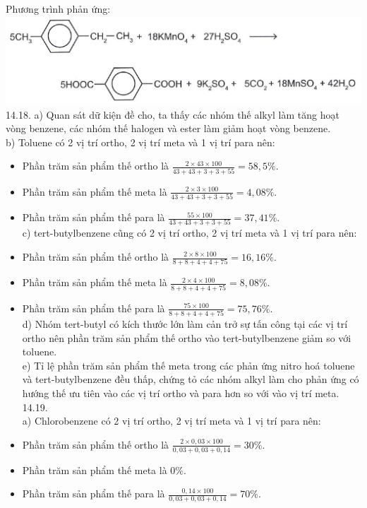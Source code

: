 \documentclass[10pt]{article}
\begin{document}
Phương trình phản ứng:\\
\includegraphics[max width=\textwidth, center]{2025_10_23_adad5b98d65ac6665838g-26(7)}\\
14.18. a) Quan sát dữ kiện đề cho, ta thấy các nhóm thế alkyl làm tăng hoạt vòng benzene, các nhóm thế halogen và ester làm giảm hoạt vòng benzene.\\
b) Toluene có 2 vị trí ortho, 2 vị trí meta và 1 vị trí para nên:

\begin{itemize}
  \item Phần trăm sản phẩm thế ortho là $\frac{2 \times 43 \times 100}{43+43+3+3+55}=58,5 \%$.
  \item Phần trăm sản phẩm thế meta là $\frac{2 \times 3 \times 100}{43+43+3+3+55}=4,08 \%$.
  \item Phần trăm sản phẩm thế para là $\frac{55 \times 100}{43+43+3+3+55}=37,41 \%$.\\
c) tert-butylbenzene cũng có 2 vị trí ortho, 2 vị trí meta và 1 vị trí para nên:
  \item Phần trăm sản phẩm thế ortho là $\frac{2 \times 8 \times 100}{8+8+4+4+75}=16,16 \%$.
  \item Phần trăm sản phẩm thế meta là $\frac{2 \times 4 \times 100}{8+8+4+4+75}=8,08 \%$.
  \item Phần trăm sản phẩm thế para là $\frac{75 \times 100}{8+8+4+4+75}=75,76 \%$.\\
d) Nhóm tert-butyl có kích thước lớn làm cản trở sự tấn công tại các vị trí ortho nên phần trăm sản phẩm thế ortho vào tert-butylbenzene giảm so với toluene.\\
e) Tỉ lệ phần trăm sản phẩm thế meta trong các phản ứng nitro hoá toluene và tert-butylbenzene đều thấp, chứng tỏ các nhóm alkyl làm cho phản ứng có hướng thế ưu tiên vào các vị trí ortho và para hơn so với vào vị trí meta.\\
14.19.\\
a) Chlorobenzene có 2 vị trí ortho, 2 vị trí meta và 1 vị trí para nên:
  \item Phần trăm sản phẩm thế ortho là $\frac{2 \times 0,03 \times 100}{0,03+0,03+0,14}=30 \%$.
  \item Phần trăm sản phẩm thế meta là $0 \%$.
  \item Phần trăm sản phẩm thế para là $\frac{0,14 \times 100}{0,03+0,03+0,14}=70 \%$.
\end{itemize}
\end{document}
